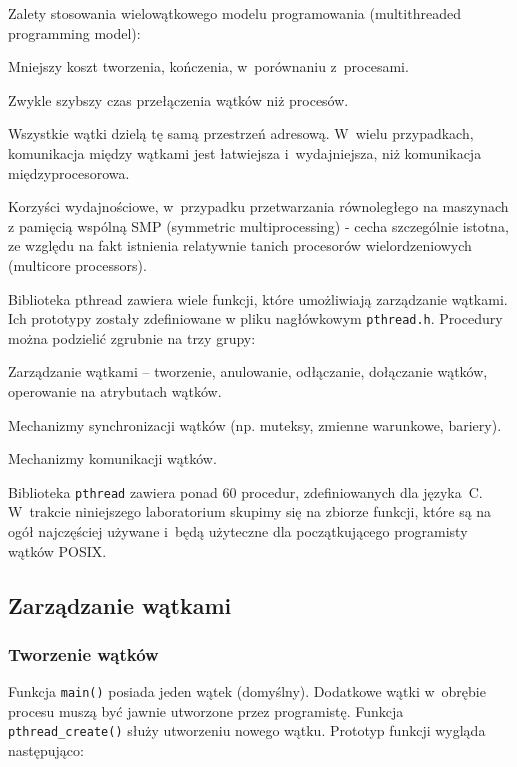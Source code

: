 Zalety stosowania wielowątkowego modelu programowania (multithreaded programming model):

\begin{myitemize}
\item Mniejszy koszt tworzenia, kończenia, w~porównaniu z~procesami.
\item Zwykle szybszy czas przełączenia wątków niż procesów.
\item Wszystkie wątki dzielą tę samą przestrzeń adresową. W~wielu przypadkach, komunikacja między wątkami jest łatwiejsza i~wydajniejsza, niż komunikacja międzyprocesorowa.
\item Korzyści wydajnościowe, w~przypadku przetwarzania równoległego na maszynach z pamięcią wspólną SMP (symmetric multiprocessing) - cecha szczególnie istotna, ze względu na fakt istnienia relatywnie tanich procesorów wielordzeniowych (multicore processors).
\end{myitemize}

Biblioteka pthread zawiera wiele funkcji, które umożliwiają zarządzanie wątkami. Ich prototypy zostały zdefiniowane w pliku nagłówkowym \lstinline[style=MyBashStyle]{pthread.h}.  Procedury można podzielić zgrubnie na trzy grupy:

\begin{myitemize}
\item Zarządzanie wątkami – tworzenie, anulowanie, odłączanie, dołączanie wątków, operowanie na atrybutach wątków.
\item Mechanizmy synchronizacji wątków (np. muteksy, zmienne warunkowe, bariery).
\item Mechanizmy komunikacji wątków.
\end{myitemize}

Biblioteka \lstinline[style=MyBashStyle]{pthread} zawiera ponad 60 procedur, zdefiniowanych dla języka~C. W~trakcie niniejszego laboratorium skupimy się na zbiorze funkcji, które są na ogół najczęściej używane i~będą użyteczne dla początkującego programisty wątków POSIX.

\subsection{Zarządzanie wątkami}
\subsubsection{Tworzenie wątków}

Funkcja \lstinline[style=MyCStyle]{main()} posiada jeden wątek (domyślny). Dodatkowe wątki w~obrębie procesu muszą być jawnie utworzone przez programistę. Funkcja \lstinline[style=MyCStyle]{pthread_create()} służy utworzeniu nowego wątku. Prototyp funkcji wygląda następująco:


